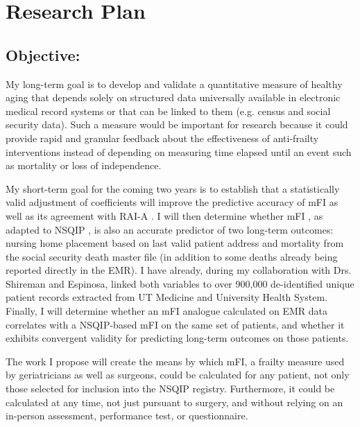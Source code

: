 \section{Research Plan }\label{research-plan}


\subsection{Objective:}\label{objective}
  
My long-term goal is to develop and validate a quantitative measure of healthy aging that depends solely on structured data universally available in electronic medical record systems or that can be linked to them (e.g. census and social security data). Such a measure would be important for research because it could provide rapid and granular feedback about the effectiveness of anti-frailty interventions instead of depending on measuring time elapsed until an event such as mortality or loss of independence. 

My short-term goal for the coming two years is to establish that a statistically valid adjustment of coefficients will improve the predictive accuracy of mFI as well as its agreement with RAI-A \cite{Isharwal_2016,Melin_2015}. I will then determine whether mFI \cite{Rockwood_2005}, as adapted to NSQIP \cite{Tsiouris_2013}, is also an accurate predictor of two long-term outcomes: nursing home placement based on last valid patient address and mortality from the social security death master file (in addition to some deaths already being reported directly in the EMR). I have already, during my collaboration with Drs. Shireman and Espinosa, linked both variables to over 900,000 de-identified unique patient records extracted from UT Medicine and University Health System. Finally, I will determine whether an mFI analogue calculated on EMR data correlates with a NSQIP-based mFI on the same set of patients, and whether it exhibits convergent validity for predicting long-term outcomes on those patients. 

The work I propose will create the means by which mFI, a frailty measure used by geriatricians as well as surgeons, could be calculated for any patient, not only those selected for inclusion into the NSQIP registry. Furthermore, it could be calculated at any time, not just pursuant to surgery, and without relying on an in-person assessment, performance test, or questionnaire.

